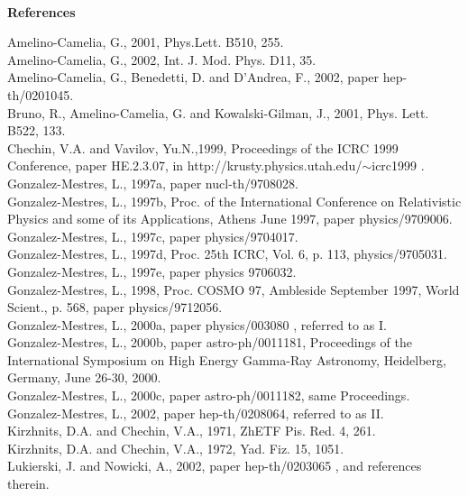 \documentclass[a4paper,12pt,dvips]{article}
\begin{document}
~ 
~ 

%
%
%
\vspace{1ex}
\begin{center}
{\bf References}
\end{center}
%
\noindent
Amelino-Camelia, G., 2001, Phys.Lett. B510, 255. \\
Amelino-Camelia, G., 2002, Int. J. Mod. Phys. D11, 35.\\
Amelino-Camelia, G., Benedetti, D. and D'Andrea, F., 2002, paper hep-th/0201045.\\
Bruno, R., Amelino-Camelia, G. and Kowalski-Gilman, J., 2001, Phys. Lett. B522, 133.\\
Chechin, V.A. and Vavilov, Yu.N.,1999, Proceedings of the ICRC 1999 Conference, paper HE.2.3.07, in http://krusty.physics.utah.edu/$\sim $icrc1999 .\\
Gonzalez-Mestres, L., 1997a, paper nucl-th/9708028.\\
Gonzalez-Mestres, L., 1997b, Proc. of the International
Conference on Relativistic Physics and some of its Applications, Athens June 1997, paper physics/9709006. \\
Gonzalez-Mestres, L., 1997c, paper physics/9704017.\\
Gonzalez-Mestres, L., 1997d, Proc. 25th ICRC, Vol. 6, p. 113, physics/9705031.\\
Gonzalez-Mestres, L., 1997e, paper physics 9706032.\\
Gonzalez-Mestres, L., 1998, Proc. COSMO 97, Ambleside September 1997,
World Scient., p. 568, paper physics/9712056. \\
Gonzalez-Mestres, L., 2000a, paper physics/003080 , referred to as I.\\
Gonzalez-Mestres, L., 2000b, paper astro-ph/0011181, Proceedings of the International Symposium on High Energy Gamma-Ray Astronomy, Heidelberg, Germany, June 26-30, 2000. \\
Gonzalez-Mestres, L., 2000c, paper astro-ph/0011182, same Proceedings.\\
Gonzalez-Mestres, L., 2002, paper hep-th/0208064, referred to as II.\\
Kirzhnits, D.A. and Chechin, V.A., 1971, ZhETF Pis. Red. 4, 261.\\
Kirzhnits, D.A. and Chechin, V.A., 1972, Yad. Fiz. 15, 1051. \\ 
Lukierski, J. and Nowicki, A., 2002, paper hep-th/0203065 , and references therein. \\
\end{document}
